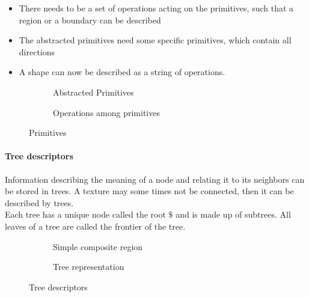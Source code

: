 \begin{itemize}
\item There needs to be a set of
operations acting on the
primitives, such that a region or a
boundary can be described
\item The abstracted primitives need
some specific primitives, which
contain all directions
\item A shape can now be described as a string of operations.
\end{itemize}
\begin{figure}[h]
	\centering
	\begin{subfigure}[b]{0.45\textwidth}
		\centering
		\caption{Abstracted Primitives}
	\end{subfigure}
	\begin{subfigure}[b]{0.45\textwidth}
		\centering
		\caption{Operations among primitives}
	\end{subfigure}
	\caption{Primitives}
\end{figure}

\paragraph{Tree descriptors} 
Information describing the meaning of a node and relating it to its neighbors can be stored in trees.
A texture may some times not be connected, then it can be described by trees. \\

Each tree has a unique node called the root $\$$ and is made up of subtrees. All leaves of a tree are called the frontier of the tree.

\begin{figure}[h]
	\centering
	\begin{subfigure}[b]{0.45\textwidth}
		\centering
		\caption{Simple composite region}
	\end{subfigure}
	\begin{subfigure}[b]{0.45\textwidth}
		\centering
		\caption{Tree representation}
	\end{subfigure}
	\caption{Tree descriptors}
\end{figure}
